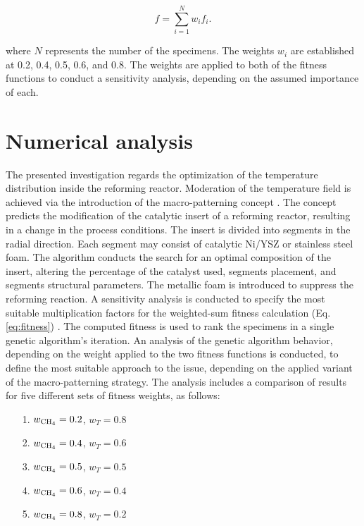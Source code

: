 \documentclass[preprint,12pt]{elsarticle}
\begin{document}
\begin{equation}
\label{eq:fitness}
f = \sum_{i = 1}^{N} w_{i}f_{i}.
\end{equation}

\noindent where $N$ represents the number of the specimens. The weights $w_{i}$ are established at 0.2, 0.4, 0.5, 0.6, and 0.8. The weights are applied to both of the fitness functions to conduct a sensitivity analysis, depending on the assumed importance of each. 
\clearpage






\section{Numerical analysis}
\label{sec:num_analysis}

The presented investigation regards the optimization of the temperature distribution inside the reforming reactor. Moderation of the temperature field is achieved via the introduction of the macro-patterning concept \cite{Pajak2018}. The concept predicts the modification of the catalytic insert of a reforming reactor, resulting in a change in the process conditions. The insert is divided into segments in the radial direction. Each segment may consist of catalytic Ni/YSZ or stainless steel foam. The algorithm conducts the search for an optimal composition of the insert, altering the percentage of the catalyst used, segments placement, and segments structural parameters.  The metallic foam is introduced to suppress the reforming reaction. A sensitivity analysis is conducted to specify the most suitable multiplication factors for the weighted-sum fitness calculation (Eq. \eqref{eq:fitness}) \cite{Davahli2022}. The computed fitness is used to rank the specimens in a single genetic algorithm's iteration. An analysis of the genetic algorithm behavior, depending on the weight applied to the two fitness functions is conducted, to define the most suitable approach to the issue, depending on the applied variant of the macro-patterning strategy. The analysis includes a comparison of results for five different sets of fitness weights, as follows:

\begin{itemize}
\item[1.] {$w_{\rm{CH_4}}  = 0.2$, $w_{T}  = 0.8$ }
\item[2.] {$w_{\rm{CH_4}}  = 0.4$, $w_{T}  = 0.6$ }
\item[3.] {$w_{\rm{CH_4}}  = 0.5$, $w_{T}  = 0.5$ }
\item[4.] {$w_{\rm{CH_4}}  = 0.6$, $w_{T}  = 0.4$ }
\item[5.] {$w_{\rm{CH_4}}  = 0.8$, $w_{T}  = 0.2$ }
\end{itemize}
\end{document}
